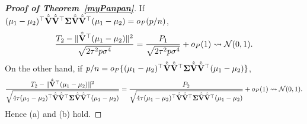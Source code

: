 \documentclass[times,sort&compress,3p]{elsarticle}
\theoremstyle{plain}
\theoremstyle{definition}
\theoremstyle{remark}
\begin{document}
\begin{appendices}
\begin{proof}[\textbf{Proof of Theorem~\ref{myPanpan}}]
If $(\mu_1-\mu_2)^\top  \hat{\tilde{\mathbf{V}}}\hat{\tilde{\mathbf{V}}}^\top  \boldsymbol{\Sigma}\hat{\tilde{\mathbf{V}}}\hat{\tilde{\mathbf{V}}}^\top  (\mu_1-\mu_2)=o_P(p/n)$,
$$
\frac{T_2-\|\hat{\tilde{\mathbf{V}}}^\top  (\mu_1-\mu_2)\|^2}{\sqrt{2\tau^2 p \sigma^4}}
=
\frac{P_1}{\sqrt{2\tau^2 p \sigma^4}}+o_P(1)\rightsquigarrow \mathcal{N}(0,1).
$$
On the other hand, if $p/n=o_P\{(\mu_1-\mu_2)^\top  \hat{\tilde{\mathbf{V}}}\hat{\tilde{\mathbf{V}}}^\top  \boldsymbol{\Sigma}\hat{\tilde{\mathbf{V}}}\hat{\tilde{\mathbf{V}}}^\top  (\mu_1-\mu_2)\}$,
$$
\frac{T_2-\|\hat{\tilde{\mathbf{V}}}^\top  (\mu_1-\mu_2)\|^2}{\sqrt{4\tau (\mu_1-\mu_2)^\top  \hat{\tilde{\mathbf{V}}}\hat{\tilde{\mathbf{V}}}^\top  \boldsymbol{\Sigma}\hat{\tilde{\mathbf{V}}}\hat{\tilde{\mathbf{V}}}^\top  (\mu_1-\mu_2)}}
=
\frac{P_2}{\sqrt{4\tau (\mu_1-\mu_2)^\top  \hat{\tilde{\mathbf{V}}}\hat{\tilde{\mathbf{V}}}^\top  \boldsymbol{\Sigma}\hat{\tilde{\mathbf{V}}}\hat{\tilde{\mathbf{V}}}^\top  (\mu_1-\mu_2)}}+o_P(1)\rightsquigarrow \mathcal{N}(0,1).
$$
Hence (a) and (b) hold.


\end{proof}
\end{appendices}
\end{document}
